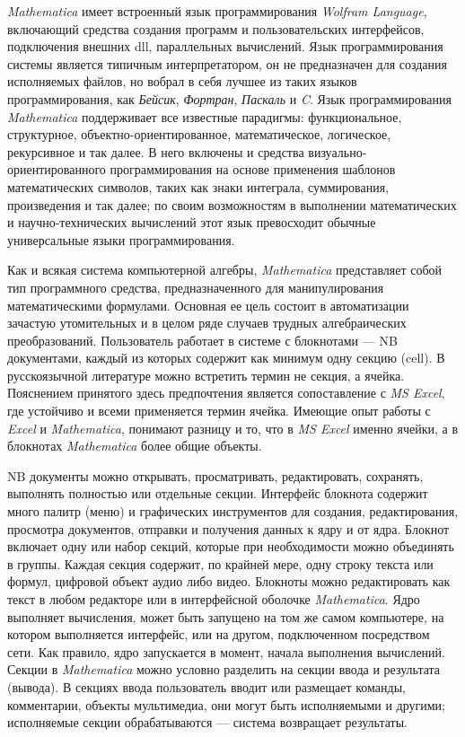 \textit{Mathematica} имеет встроенный язык программирования \textit{Wolfram Language}, включающий средства создания программ и пользовательских интерфейсов, подключения внешних dll, параллельных вычислений. Язык программирования системы является типичным интерпретатором, он не предназначен для создания исполняемых файлов, но вобрал в себя лучшее из таких языков программирования, как \textit{Бейсик}, \textit{Фортран}, \textit{Паскаль} и \textit{C}. Язык программирования \textit{Mathematica} поддерживает все известные парадигмы: функциональное, структурное, объектно-ориентированное, математическое, логическое, рекурсивное и так далее. В него включены и средства визуально-ориентированного программирования на основе применения шаблонов математических символов, таких как знаки интеграла, суммирования, произведения и так далее; по своим возможностям в выполнении математических и научно-технических вычислений этот язык превосходит обычные универсальные языки программирования.

Как и всякая система компьютерной алгебры, \textit{Mathematica} представляет собой тип программного средства, предназначенного для манипулирования математическими формулами. Основная ее цель состоит в автоматизации зачастую утомительных и в целом ряде случаев трудных алгебраических преобразований. Пользователь работает в системе с блокнотами --- NB документами, каждый из которых содержит как минимум одну секцию (cell). В русскоязычной литературе можно встретить термин не секция, а ячейка. Пояснением принятого здесь предпочтения является сопоставление с \textit{MS Excel}, где устойчиво и всеми применяется термин ячейка. Имеющие опыт работы с \textit{Excel} и \textit{Mathematica}, понимают разницу и то, что в \textit{MS Excel} именно ячейки, а в блокнотах \textit{Mathematica} более общие объекты. 

NB документы можно открывать, просматривать, редактировать, сохранять, выполнять полностью или отдельные секции. Интерфейс блокнота содержит много палитр (меню) и графических инструментов для создания, редактирования, просмотра документов, отправки и получения данных к ядру и от ядра. Блокнот включает одну или набор секций, которые при необходимости можно объединять в группы. Каждая секция содержит, по крайней мере, одну строку текста или формул, цифровой объект аудио либо видео. Блокноты можно редактировать как текст в любом редакторе или в интерфейсной оболочке \textit{Mathematica}. Ядро выполняет вычисления, может быть запущено на том же самом компьютере, на котором выполняется интерфейс, или на другом, подключенном посредством сети. Как правило, ядро запускается в момент, начала выполнения вычислений.
Секции в \textit{Mathematica} можно условно разделить на секции ввода и результата (вывода). В секциях ввода пользователь вводит или размещает команды, комментарии, объекты мультимедиа, они могут быть исполняемыми и другими; исполняемые секции обрабатываются --- система возвращает результаты.

